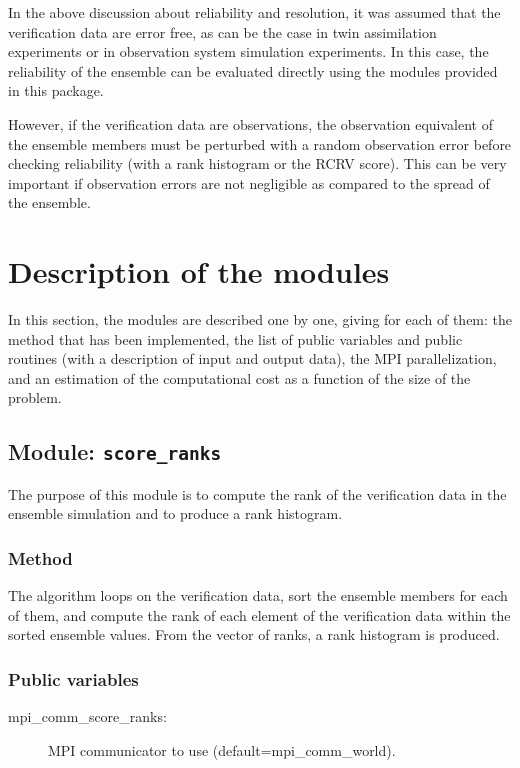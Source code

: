 \documentclass[11pt]{article}
\begin{document}
In the above discussion about reliability and resolution,
it was assumed that the verification data are error free,
as can be the case in twin assimilation experiments or
in observation system simulation experiments.
In this case, the reliability of the ensemble
can be evaluated directly using the modules provided in this package.

However, if the verification data are observations,
the observation equivalent of the ensemble members
must be perturbed with a random observation error
before checking reliability (with a rank histogram or the RCRV score).
This can be very important if observation errors are not negligible
as compared to the spread of the ensemble.

\clearpage

\section{Description of the modules}

In this section,
the modules are described one by one,
giving for each of them:
the method that has been implemented,
the list of public variables and public routines
(with a description of input and output data),
the MPI parallelization, and
an estimation of the computational cost
as a function of the size of the problem.

\subsection{Module: {\tt\bf score\_ranks}}

The purpose of this module is to compute the rank
of the verification data in the ensemble simulation
and to produce a rank histogram.

\subsubsection*{Method}

The algorithm loops on the verification data,
sort the ensemble members for each of them,
and compute the rank of each element of the verification data
within the sorted ensemble values.
From the vector of ranks, a rank histogram is produced.

\subsubsection*{Public variables}

\begin{description}
\item[mpi\_comm\_score\_ranks:] MPI communicator to use (default=mpi\_comm\_world).
\end{description}
\end{document}
